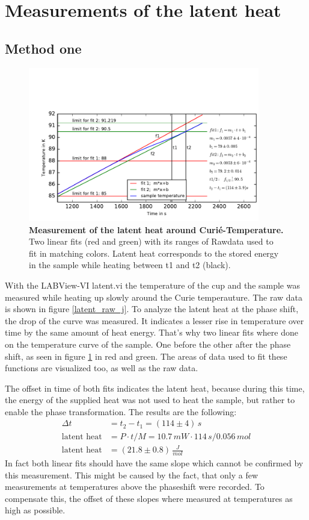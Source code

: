 \documentclass{include/thesisclass3}
\newcommand{\e}[1]{\,\si{#1}}
\begin{document}
\section{Measurements of the latent heat}
\subsection{Method one}
\begin{figure}[H]
\includegraphics[width = 0.9\textwidth]{fig/latent_j.pdf}
\caption{\label{latent_j}\textbf{Measurement of the latent heat around Curié-Temperature.} Two linear fits (red and green) with its ranges of Rawdata used to fit in matching colors. Latent heat corresponds to the stored energy in the sample while heating between t1 and t2 (black).}
\end{figure}
With the LABView-VI latent.vi the temperature of the cup and the sample was measured while heating up slowly around the Curie temperauture. The raw data is shown in figure \ref{latent_raw_j}. To analyze the latent heat at the phase shift, the drop of the curve was measured. It indicates a lesser rise in temperature over time by the same amount of heat energy. That's why two linear fits where done on the temperature curve of the sample. One before the other after the phase shift, as seen in figure \ref{latent_j} in red and green. The areas of data used to fit these functions are visualized too, as well as the raw data. 

The offset in time of both fits indicates the latent heat, because during this time, the energy of the supplied heat was not used to heat the sample, but rather to enable the phase transformation. The results are the following:
\begin{align}
\Delta t &= t_2-t_1=(114\pm 4)\e{s}\\
\textrm{latent heat} &= P \cdot t / M=10.7\e{mW}\cdot 114\e{s}/0.056\e{mol} \\
\textrm{latent heat} &= (21.8 \pm 0.8)\e{\frac{J}{mol}}
\end{align}
In fact both linear fits should have the same slope which cannot be confirmed by this measurement. This might be caused by the fact, that only a few measurements at temperatures above the phaseshift were recorded. To compensate this, the offset of these slopes where measured at temperatures as high as possible.
\end{document}

